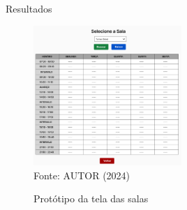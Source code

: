 \begin{frame}{Resultados}
    \begin{figure}
        \centering
        \vspace{-0.5cm}
        \caption{Protótipo da tela das salas}
        \vspace{-0.2cm}
        \includegraphics[width=0.5\textwidth]{figuras/proto-5.png}
        \\ %
        \small Fonte: AUTOR (2024)
    \end{figure}
\end{frame}